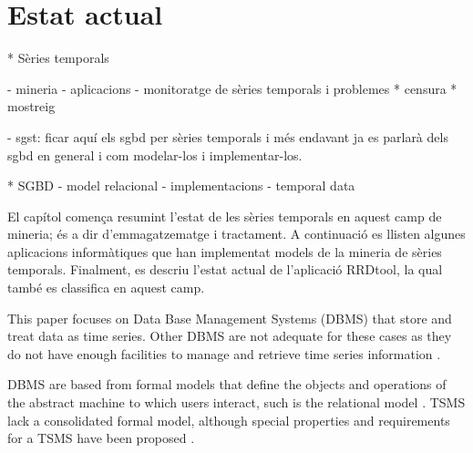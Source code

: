 \chapter{Estat actual}
\label{cap:estat}


* Sèries temporals
  
  - mineria
  - aplicacions
  - monitoratge de sèries temporals i problemes
     * censura
     * mostreig

  - sgst: 
      ficar aquí els sgbd per sèries temporals i més endavant ja es parlarà dels sgbd en general i com modelar-los i implementar-los.


* SGBD
 - model relacional
 - implementacions
 - temporal data






El capítol comença resumint l'estat de les sèries temporals en aquest camp de mineria; és a dir d'emmagatzematge i tractament. A continuació es llisten algunes aplicacions informàtiques que han implementat models de la mineria de sèries temporals. Finalment, es descriu l'estat actual de l'aplicació RRDtool, la qual també es classifica en aquest camp.

This paper focuses on Data Base Management Systems (DBMS) that store
and treat data as time series.   Other DBMS are not adequate for these cases as they do not have enough facilities to manage and retrieve time series
information \parencite{schmidt95}.

DBMS are based from formal models that define the objects and
operations of the abstract machine to which users interact, such is
the relational model \parencite{date}. TSMS lack a consolidated formal
model, although special properties and requirements for a TSMS
have been proposed \parencite{dreyer94}.













